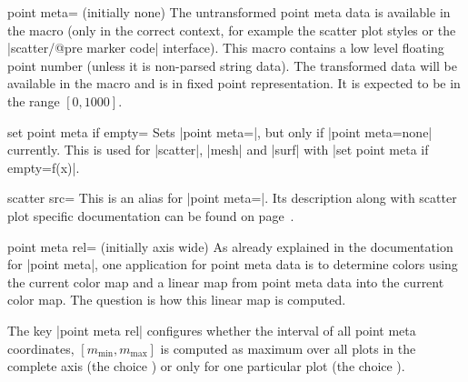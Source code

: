 \begin{pgfplotskey}{point meta= (initially none)}
	The untransformed point meta data is available in the macro \declareandlabel{\pgfplotspointmeta} (only in the correct context, for example the scatter plot styles or the |scatter/@pre marker code| interface). This macro contains a low level floating point number (unless it is non-parsed string data). The transformed data will be available in the macro \declareandlabel{\pgfplotspointmetatransformed} and is in fixed point representation. It is expected to be in the range $[0,1000]$.

\end{pgfplotskey}

\begin{pgfplotskey}{set point meta if empty=}
	Sets |point meta=|, but only if |point meta=none| currently. This is used for |scatter|, |mesh| and |surf| with |set point meta if empty=f(x)|.
\end{pgfplotskey}

\begin{pgfplotskey}{scatter src=}
	This is an alias for |point meta=|. Its description along with scatter plot specific documentation can be found on page~\pageref{pgfplots:scatter:src}.
\end{pgfplotskey}

\begin{pgfplotskey}{point meta rel= (initially axis wide)}
	As already explained in the documentation for |point meta|, one application for point meta data is to determine colors using the current color map and a linear map from point meta data into the current color map. The question is how this linear map is computed. 

	The key |point meta rel| configures whether the interval of all point meta coordinates, $[m_{\text{min}},m_{\text{max}}]$ is computed as maximum over all plots in the complete axis (the choice ) or only for one particular plot (the choice ).

\begin{codeexample}[]
~
\end{codeexample}
\end{pgfplotskey}

